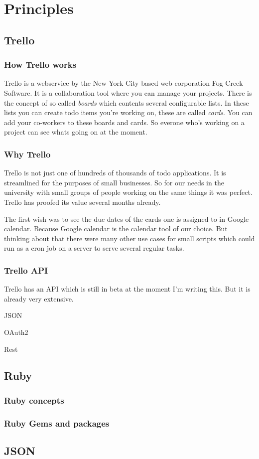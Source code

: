 
\chapter{Principles}
  \label{Principles}

\section{Trello}

\subsection{How Trello works}
Trello is a webservice by the New York City based web corporation Fog Creek Software. It is a collaboration tool where you can manage your projects. There is the concept of so called \emph{boards} which contents several configurable lists. In these lists you can create todo items you're working on, these are called \emph{cards}. You can add your co-workers to these boards and cards. So everone who's working on a project can see whats going on at the moment.

\subsection{Why Trello}
Trello is not just one of hundreds of thousands of todo applications. It is streamlined for the purposes of small businesses. So for our needs in the university with small groups of people working on the same things it was perfect. Trello has proofed its value several months already.

The first wish was to see the due dates of the cards one is assigned to in Google calendar. Because Google calendar is the calendar tool of our choice. But thinking about that there were many other use cases for small scripts which could run as a cron job on a server to serve several regular tasks.

\subsection{Trello API}
Trello has an API which is still in beta at the moment I'm writing this. But it is already very extensive.

JSON

OAuth2

Rest

\section{Ruby}

\subsection{Ruby concepts}

\subsection{Ruby Gems and packages}

\section{JSON}